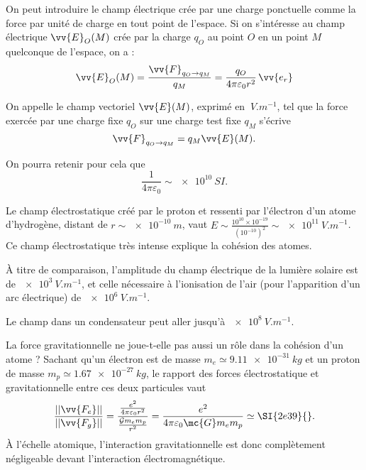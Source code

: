 \documentclass[12pt,fancy]{/Users/victor/Documents/COURS/2ACapECL/texmf/tex/latex/Preambles/cours}
\begin{document}

On peut introduire le champ électrique crée par une charge ponctuelle comme la force par unité de charge en tout point de l'espace. Si on s'intéresse au champ électrique $\vv{E}_{O}(M)$ crée par la charge $q_{O}$ au point $O$ en un point $M$ quelconque de l'espace, on a :
\begin{equation*}
\vv{E}_{O}(M) = \frac{\vv{F}_{q_O\rightarrow q_M}}{q_{M}} = \frac{q_O}{4\pi\varepsilon_0 r^2}\,\vv{e_r}
\end{equation*}

\begin{definition}
On appelle  le champ vectoriel $\vv{E}(M)$,  exprimé en $\SI{}{V.m^{-1}}$,
 tel que la force exercée par une charge fixe $q_O$ sur une charge test fixe $q_M$ s’écrive
\begin{equation*}
\vv{F}_{q_O\rightarrow q_M}=q_M \vv{E}(M).
\end{equation*}

\end{definition}

\noindent On pourra retenir pour cela  que
\begin{equation*}
\frac{1}{4\pi\varepsilon_0}\sim \SI{e10}{SI}.
\end{equation*}
\begin{odg}
\begin{liste}
\item Le champ électrostatique créé par le proton et ressenti par l’électron d’un atome d’hydrogène, distant de $r\sim\SI{e-10}{m}$, vaut  $E \sim \frac{10^{10}\times 10^{-19}}{(10^{-10})^{2}}\sim \SI{e11}{V.m^{-1}}$. Ce champ électrostatique très intense explique la cohésion des atomes.
\item À titre de comparaison, l'amplitude du champ électrique de la lumière solaire est de $\SI{e3}{V.m^{-1}}$, et celle nécessaire à l'ionisation de l'air (pour l'apparition d'un arc électrique) de $\SI{e6}{V.m^{-1}}$.
\item Le champ dans un condensateur peut aller jusqu'à $\SI{e8}{V.m^{-1}}$.
\item La force gravitationnelle ne joue-t-elle pas aussi un rôle dans la cohésion d'un atome ? Sachant qu’un électron est de masse $m_e\simeq\SI{9,11e-31}{kg}$ et un proton de masse $m_p\simeq\SI{1,67e-27}{kg}$, le rapport des forces électrostatique et gravitationnelle entre ces deux particules vaut
\begin{equation*}
\frac{||\vv{F_e}||}{||\vv{F_g}||}=\dfrac{\frac{e^2}{4\pi\varepsilon_0 r^2}}{\frac{\mathcal{G}m_e m_p}{r^2}}=\frac{e^2}{4\pi\varepsilon_0 \mc{G}m_{e}m_p}\simeq \SI{2e39}{}.
\end{equation*}
À l'échelle atomique, l'interaction gravitationnelle est donc complètement négligeable devant l'interaction électromagnétique.
\end{liste}
\end{odg}
\end{document}
